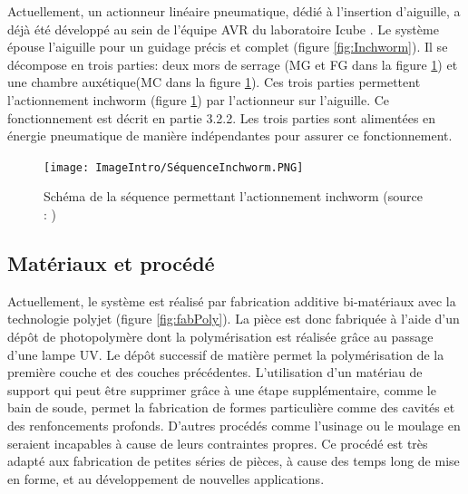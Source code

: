 \documentclass[10pt, a4paper]{article}
\begin{document}
         Actuellement, un actionneur linéaire pneumatique, dédié à l'insertion d'aiguille, a déjà été développé au sein de l'équipe AVR du laboratoire Icube \cite{Pfeil2018}. Le système épouse l'aiguille pour un guidage précis et complet (figure \ref{fig:Inchworm}). Il se décompose en trois parties: deux mors de serrage (MG et FG dans la figure \ref{fig:planInchworm}) et une chambre auxétique(MC dans la figure \ref{fig:planInchworm}). Ces trois parties permettent l'actionnement inchworm (figure \ref{fig:planInchworm}) par l'actionneur sur l'aiguille. Ce fonctionnement est décrit en partie 3.2.2. Les trois parties sont alimentées en énergie pneumatique de manière indépendantes pour assurer ce fonctionnement. 
        
\begin{figure}[ht!]
\centering
\texttt{[image: ImageIntro/SéquenceInchworm.PNG]}
\caption{ Schéma de la séquence permettant l'actionnement inchworm (source : \cite{Pfeil2018})}
\label{fig:planInchworm}
\end{figure}
        
    \subsection{Matériaux et procédé}

         Actuellement, le système est réalisé par fabrication additive bi-matériaux avec la technologie polyjet \cite{Pfeil2018} (figure \ref{fig:fabPoly}). La pièce est donc fabriquée à l'aide d'un dépôt de photopolymère dont la polymérisation est réalisée grâce au passage d'une lampe UV. Le dépôt successif de matière permet la polymérisation de la première couche et des couches précédentes. L'utilisation d'un matériau de support qui peut être supprimer grâce à une étape supplémentaire, comme le bain de soude, permet la fabrication de formes particulière comme des cavités et des renfoncements profonds. D'autres procédés comme l'usinage ou le moulage en seraient incapables à cause de leurs contraintes propres. Ce procédé est très adapté aux fabrication de petites séries de pièces, à cause des temps long de mise en forme, et au développement de nouvelles applications. 
        
\end{document}
